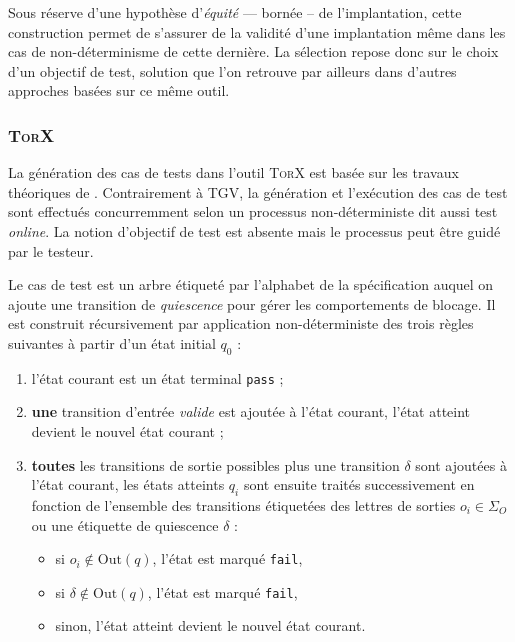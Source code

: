 Sous r\'eserve d'une hypoth\`ese d'\emph{\'equit\'e} --- born\'ee
-- de l'implantation, cette construction permet de s'assurer de la
validit\'e d'une implantation m\^eme dans  les cas de
non-d\'eterminisme de cette derni\`ere. 
La s\'election repose donc sur le choix d'un objectif de
test, solution que l'on retrouve par ailleurs dans d'autres approches
bas\'ees sur ce m\^eme outil\cite{test-pf,stg}.

\subsubsection{\textsc{TorX}}

La g\'en\'eration des cas de tests dans l'outil \textsc{TorX} est
bas\'ee sur les travaux th\'eoriques de
\cite{thtretmans}. Contrairement \`a \textsf{TGV}, la g\'en\'eration et
l'ex\'ecution des cas de test sont effectu\'es concurremment selon
un processus non-d\'eterministe\cite{tgenioq} dit aussi test \emph{online}. La notion d'objectif de test est
absente mais le processus peut \^etre guid\'e par le testeur. 

Le cas de test est un arbre \'etiquet\'e par l'alphabet de la
sp\'ecification auquel on ajoute une transition de \emph{quiescence}
pour g\'erer les comportements de blocage. Il est construit
r\'ecursivement par application non-d\'eterministe des trois
r\`egles suivantes \`a partir d'un \'etat initial $q_0$ :
\begin{enumerate}
  \item l'\'etat courant est un \'etat terminal \texttt{pass} ;
  \item \textbf{une} transition d'entr\'ee \emph{valide} est ajout\'ee \`a
  l'\'etat courant, l'\'etat atteint devient le nouvel \'etat
  courant ;
\item \textbf{toutes} les transitions de sortie possibles plus une transition
  $\delta$ sont ajout\'ees \`a l'\'etat courant, les \'etats
  atteints $q_i$ sont ensuite trait\'es successivement en fonction de
  l'ensemble des transitions \'etiquet\'ees des lettres de sorties
  $o_i\in \Sigma_O$ ou une \'etiquette de quiescence $\delta$ :
  \begin{itemize}
    \item si $o_i\not\in \mathrm{Out}(q)$, l'\'etat est marqu\'e
      \texttt{fail},
    \item si $\delta\not\in \mathrm{Out}(q)$, l'\'etat est marqu\'e
      \texttt{fail},
    \item sinon, l'\'etat atteint devient le nouvel \'etat courant.
  \end{itemize}
\end{enumerate}

